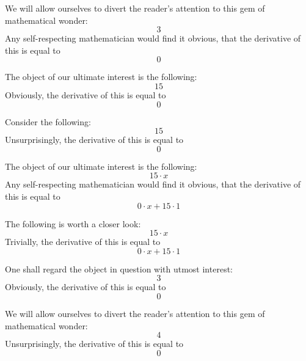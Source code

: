 \documentclass{article}
\begin{document}
We will allow ourselves to divert the reader's attention to this gem of mathematical wonder:
\begin{equation}
3 
\end{equation}
Any self-respecting mathematician would find it obvious, that the derivative of this is equal to
\begin{equation}
0 
\end{equation}

The object of our ultimate interest is the following:
\begin{equation}
15 
\end{equation}
Obviously, the derivative of this is equal to
\begin{equation}
0 
\end{equation}

Consider the following:
\begin{equation}
15 
\end{equation}
Unsurprisingly, the derivative of this is equal to
\begin{equation}
0 
\end{equation}

The object of our ultimate interest is the following:
\begin{equation}
15 \cdot x 
\end{equation}
Any self-respecting mathematician would find it obvious, that the derivative of this is equal to
\begin{equation}
0 \cdot x + 15 \cdot 1 
\end{equation}

The following is worth a closer look:
\begin{equation}
15 \cdot x 
\end{equation}
Trivially, the derivative of this is equal to
\begin{equation}
0 \cdot x + 15 \cdot 1 
\end{equation}

One shall regard the object in question with utmost interest:
\begin{equation}
3 
\end{equation}
Obviously, the derivative of this is equal to
\begin{equation}
0 
\end{equation}

We will allow ourselves to divert the reader's attention to this gem of mathematical wonder:
\begin{equation}
4 
\end{equation}
Unsurprisingly, the derivative of this is equal to
\begin{equation}
0 
\end{equation}
\end{document}
